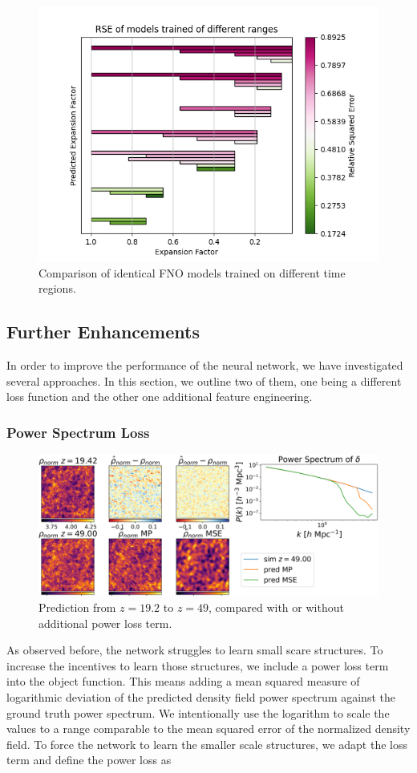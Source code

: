 \documentclass{article}
\begin{document}
\begin{figure}[h]
    \centering
    \includegraphics[width=0.7\linewidth]{img/ranges.png}
    \caption{Comparison of identical FNO models trained on different time regions.}
    \label{fig:ranges}
\end{figure}

\subsection{Further Enhancements}

In order to improve the performance of the neural network, we have investigated several approaches. In this section, we outline two of them, one being a different loss function and the other one additional feature engineering.

\subsubsection{Power Spectrum Loss}
\label{ps-loss}

\begin{figure}[h]
    \centering
    \includegraphics[width=0.8\linewidth]{img/compare_loss.png}
    \caption{Prediction from $z=19.2$ to $z=49$, compared with or without additional power loss term.}
    \label{fig:power-loss}
\end{figure}

As observed before, the network struggles to learn small scare structures. To increase the incentives to learn those structures, we include a power loss term into the object function. This means adding a mean squared measure of logarithmic deviation of the predicted density field power spectrum against the ground truth power spectrum. We intentionally use the logarithm to scale the values to a range comparable to the mean squared error of the normalized density field.
To force the network to learn the smaller scale structures, we adapt the loss term and define the power loss as
\end{document}
